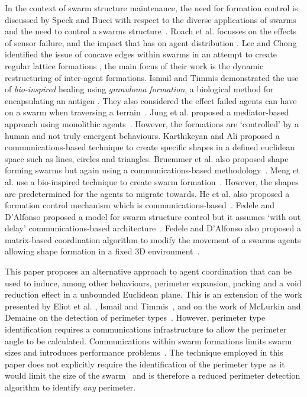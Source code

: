 \documentclass[12pt,a4paper]{IEEEtran}
\begin{document}
In the context of swarm structure maintenance, the need for formation control is discussed by Speck and Bucci with respect to the diverse applications of swarms and the need to control a swarms structure~\cite{8430773}. Roach et al. focusses on the effects of sensor failure, and the impact that has on agent distribution \cite{RMT:15}. Lee and Chong identified the issue of concave edges within swarms in an attempt to create regular lattice formations \cite{GN:08}, the main focus of their work is the dynamic restructuring of inter-agent formations. Ismail and Timmis demonstrated the use of \textit{bio-inspired} healing using \textit{granuloma formation}, a biological method for encapsulating an antigen \cite{IT:10}. They also considered the effect failed agents can have on a swarm when traversing a terrain~\cite{TIBW:16}. Jung et al. proposed a mediator-based approach using monolithic agents~\cite{6766522}. However, the formations are `controlled' by a human and not truly emergent behaviours. Karthikeyan and Ali proposed a communications-based technique to create specific shapes in a defined euclidean space such as lines, circles and triangles\cite{karthikeyan2006general}. Bruemmer et al. also proposed shape forming swarms but again using a communications-based methodology~\cite{bruemmer2002robotic}. Meng et al. use a bio-inspired technique to create swarm formation~\cite{meng2013morphogenetic}. However, the shapes are predetermined for the agents to migrate towards. He et al. also proposed a formation control mechanism which is communications-based~\cite{he2018feedback}. Fedele and D'Alfonso proposed a model for swarm structure control but it assumes `with out delay' communications-based architecture~\cite{8263694}. Fedele and D'Alfonso also proposed a matrix-based coordination algorithm to modify the movement of a swarms agents allowing shape formation in a fixed 3D environment~\cite{fedele2021coordinates}.

This paper proposes an alternative approach to agent coordination that can be used to induce, among other behaviours, perimeter expansion, packing and a void reduction effect in a unbounded Euclidean plane. This is an extension of the work presented by Eliot et al. \cite{eliot2019void}, Ismail and Timmis~\cite{IT:10,TIBW:16}, and on the work of McLurkin and Demaine on the detection of perimeter types~\cite{mclurkin2009}. However, perimeter type identification requires a communications infrastructure to allow the perimeter angle to be calculated. Communications within swarm formations limits swarm sizes and introduces performance problems~\cite{fu2020formation}. The technique employed in this paper does not explicitly require the identification of the perimeter type as it would limit the size of the swarm~\cite{eliot2019void,GN:08} and is therefore a reduced perimeter detection algorithm to identify \textit{any} perimeter.
\end{document}
